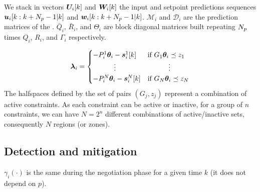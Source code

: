 \documentclass{ifacconf}  %
\begin{document}
We stack in vectors $\Uik$ and $\Wik$
the input and setpoint predictions sequences ${\uiseq}$ and ${\wiseq}$.
${\mathcal{M}_{i}}$  and ${\mathcal{D}_{i}}$ are the prediction matrices of the \mpc{}.
$\bar{Q}_{i}$, $\bar{R}_{i}$, and $\Theta_{i}$ are block diagonal matrices built repeating $N_{p}$ times $Q_{i}$, $R_{i}$, and $\Gamma_i$ respectively.

\begin{equation}
  \begin{aligned}
    \label{eq:lambdafuntheta}
    \lambdai=
    \begin{cases}
      -P_{i}^{1}\vec{\theta}_{i}-\vec{s}_{i}^{1}[k]&\text{if}\ G_{1}\thetai \preceq z_{1} \\
      \qquad\quad \vdots&\qquad\quad \vdots\\
      -P_{i}^{N}\vec{\theta}_{i}-\vec{s}_{i}^{N}[k]&\text{if}\ G_{N}\thetai \preceq z_{N} \\
    \end{cases}
  \end{aligned}
\end{equation}
The halfspaces defined by the set of pairs $(G_{j},z_{j})$ represent a combination of active constraints.
As each constraint can be active or inactive, for a group of $n$ constraints,  we can have $N=2^{n}$ different combinations of active/inactive sets, consequently $N$ regions (or zones).


\subsection{Detection and mitigation}
\begin{assumption}
  $\gamma_{i}(\cdot)$ is the same during the negotiation phase for a given time $k$ (it does not depend on $p$).
\end{assumption}
\end{document}
